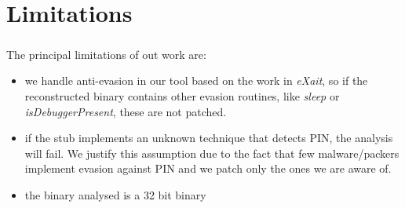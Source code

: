 \chapter{Limitations}
\label{chapter6}
\thispagestyle{empty}

\paragraph{}
The principal limitations of out work are:
\begin{itemize}
\item we handle anti-evasion in our tool based on the work in \textit{eXait}, so if the reconstructed binary contains other evasion routines, like \textit{sleep} or \textit{isDebuggerPresent}, these are not patched. 
\item  if the stub implements an unknown technique that detects PIN, the analysis will fail. We justify this assumption due to the fact that few malware/packers implement evasion against PIN and we patch only the ones we are aware of.
\item the binary analysed is a 32 bit binary
\end{itemize}